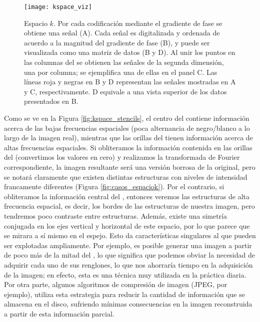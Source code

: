 \begin{figure}[htb]
 \begin{figg}
   \texttt{[image: kspace\_viz]}
   \caption{Espacio $k$. Por cada codificación mediante el gradiente de fase se obtiene una señal (A). Cada señal es digitalizada y ordenada de acuerdo a la magnitud del gradiente de fase (B), y puede ser visualizada como una matriz de datos (B y D). Al unir los puntos en las columnas del \espaciok se obtienen las señales de la segunda dimensión, una por columna; se ejemplifica una de ellas en el panel C. Las líneas roja y negras en B y D representan las señales mostradas en A y C, respectivamente. D equivale a una vista superior de los datos presentados en B.}
 \label{fig:kspace_viz}
 \end{figg}
\end{figure}



Como se ve en la Figura \ref{fig:kspace_stencils}, el centro del \espaciok contiene información acerca de las bajas frecuencias espaciales (poca alternancia de negro/blanco a lo largo de la imagen real), mientras que las orillas del \espaciok tienen información acerca de altas frecuencias espaciales. Si obliteramos la información contenida en las orillas del \espaciok (convertimos los valores en cero) y realizamos la transformada de Fourier correspondiente, la imagen resultante será una versión borrosa de la original, pero se notará claramente que existen distintas estructuras con niveles de intensidad francamente diferentes (Figura \ref{fig:casos_espaciok}). Por el contrario, si obliteramos la información central del \espaciok, entonces veremos las estructuras de alta frecuencia espacial, es decir, los bordes de las estructuras de nuestra imagen, pero tendremos poco contraste entre estructuras. Además, existe una simetría conjugada en los ejes vertical y horizontal de este espacio, por lo que parece que se mirara a sí mismo en el espejo. Esto da características singulares al \espaciok que pueden ser explotadas ampliamente. Por ejemplo, es posible generar una imagen a partir de poco más de la mitad del \espaciok, lo que significa que podemos obviar la necesidad de adquirir cada uno de sus renglones, lo que nos ahorraría tiempo en la adquisición de la imagen; en efecto, esta es una técnica muy utilizada en la práctica diaria. Por otra parte, algunos algoritmos de compresión de imagen (JPEG, por ejemplo), utiliza esta estrategia para reducir la cantidad de información que se almacena en el disco, sufriendo mínimas consecuencias en la imagen reconstruida a partir de esta información parcial.


